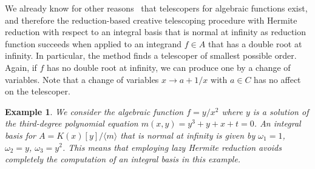 \documentclass{sig-alternate}
\newtheorem{example}[theorem]{Example}
\def\<#1>{\langle#1\rangle}
\begin{document}
We already know for other reasons~\cite{Zeilberger1990,chyzak00,chen12d} that
telescopers for algebraic functions exist, and therefore the re\-duc\-tion-based
creative telescoping procedure with Hermite reduction with respect to an
integral basis that is normal at infinity as reduction function succeeds when
applied to an integrand $f\in A$ that has a double root at infinity.
In particular, the method finds a telescoper of smallest possible order.
Again, if $f$ has no double root at infinity, we can produce one by a change of variables.
Note that a change of variables $x\to a+1/x$ with $a\in C$ has no affect on
the telescoper.

\begin{example}\label{ex:ct}
We consider the algebraic function $f=y/x^2$ where $y$ is a solution of the
third-degree polynomial equation $m(x,y) = y^3 + y + x + t = 0$. An integral
basis for $A=K(x)[y]/\<m>$ that is normal at infinity is given by
$\omega_1=1$, $\omega_2=y$, $\omega_3=y^2$.  This means that employing lazy
Hermite reduction avoids completely the computation of an integral basis in
this example.


\end{example}
\end{document}
